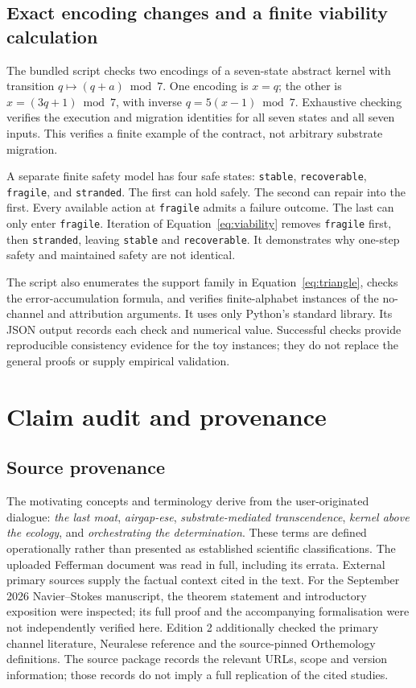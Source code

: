 \documentclass[11pt,a4paper]{article}
\theoremstyle{definition}
\theoremstyle{remark}
\begin{document}
\subsection{Exact encoding changes and a finite viability calculation}
The bundled script checks two encodings of a seven-state abstract kernel with transition $q\mapsto(q+a)\bmod7$. One encoding is $x=q$; the other is $x=(3q+1)\bmod7$, with inverse $q=5(x-1)\bmod7$. Exhaustive checking verifies the execution and migration identities for all seven states and all seven inputs. This verifies a finite example of the contract, not arbitrary substrate migration.

A separate finite safety model has four safe states: \texttt{stable}, \texttt{recoverable}, \texttt{fragile}, and \texttt{stranded}. The first can hold safely. The second can repair into the first. Every available action at \texttt{fragile} admits a failure outcome. The last can only enter \texttt{fragile}. Iteration of Equation~\eqref{eq:viability} removes \texttt{fragile} first, then \texttt{stranded}, leaving \texttt{stable} and \texttt{recoverable}. It demonstrates why one-step safety and maintained safety are not identical.

The script also enumerates the support family in Equation~\eqref{eq:triangle}, checks the error-accumulation formula, and verifies finite-alphabet instances of the no-channel and attribution arguments. It uses only Python's standard library. Its JSON output records each check and numerical value. Successful checks provide reproducible consistency evidence for the toy instances; they do not replace the general proofs or supply empirical validation.

\clearpage




\clearpage

\section{Claim audit and provenance}\label{app:audit}


\subsection*{Source provenance}
The motivating concepts and terminology derive from the user-originated dialogue: \emph{the last moat}, \emph{airgap-ese}, \emph{substrate-mediated transcendence}, \emph{kernel above the ecology}, and \emph{orchestrating the determination}. These terms are defined operationally rather than presented as established scientific classifications. The uploaded Fefferman document was read in full, including its errata. External primary sources supply the factual context cited in the text. For the September 2026 Navier--Stokes manuscript, the theorem statement and introductory exposition were inspected; its full proof and the accompanying formalisation were not independently verified here. Edition 2 additionally checked the primary channel literature, Neuralese reference and the source-pinned Orthemology definitions. The source package records the relevant URLs, scope and version information; those records do not imply a full replication of the cited studies.
\end{document}
